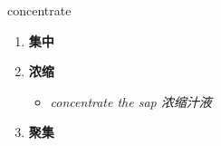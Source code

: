
\begin{frame}
{\huge concentrate}
\begin{center}
\begin{enumerate}\Large
  \item \textbf{集中}
  \item \textbf{浓缩}
  \begin{itemize}
    \item \em{\Large{concentrate the sap 浓缩汁液}}
  \end{itemize}
  \item \textbf{聚集}
\end{enumerate}
\end{center}
\end{frame}
